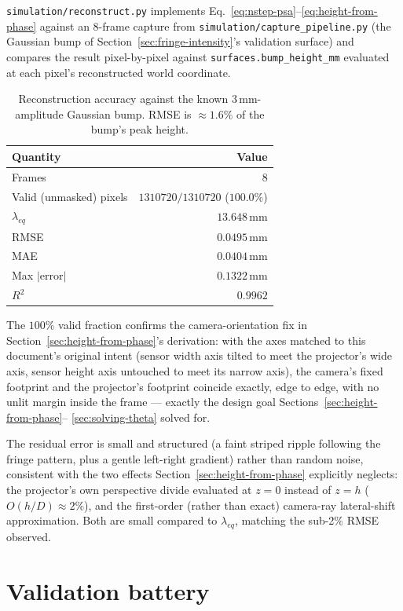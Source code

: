 \documentclass[11pt]{article}
\begin{document}
\texttt{simulation/reconstruct.py} implements
Eq.~\ref{eq:nstep-psa}--\ref{eq:height-from-phase} against an 8-frame
capture from \texttt{simulation/capture\_pipeline.py} (the Gaussian bump of
Section~\ref{sec:fringe-intensity}'s validation surface) and compares the
result pixel-by-pixel against \texttt{surfaces.bump\_height\_mm} evaluated
at each pixel's reconstructed world coordinate.

\begin{table}[h]
\centering
\begin{tabular}{@{}lr@{}}
\toprule
Quantity & Value \\
\midrule
Frames & $8$ \\
Valid (unmasked) pixels & $1310720 / 1310720$ ($100.0\%$) \\
$\lambda_{eq}$ & $13.648$\,mm \\
RMSE & $0.0495$\,mm \\
MAE & $0.0404$\,mm \\
Max $|$error$|$ & $0.1322$\,mm \\
$R^2$ & $0.9962$ \\
\bottomrule
\end{tabular}
\caption{Reconstruction accuracy against the known $3$\,mm-amplitude
Gaussian bump. RMSE is $\approx 1.6\%$ of the bump's peak height.}
\end{table}

The $100\%$ valid fraction confirms the camera-orientation fix in
Section~\ref{sec:height-from-phase}'s derivation: with the axes matched to
this document's original intent (sensor width axis tilted to meet the
projector's wide axis, sensor height axis untouched to meet its narrow
axis), the camera's fixed footprint and the projector's footprint coincide
exactly, edge to edge, with no unlit margin inside the frame --- exactly
the design goal Sections~\ref{sec:height-from-phase}--
\ref{sec:solving-theta} solved for.

The residual error is small and structured (a faint striped ripple
following the fringe pattern, plus a gentle left-right gradient) rather
than random noise, consistent with the two effects
Section~\ref{sec:height-from-phase} explicitly neglects: the projector's
own perspective divide evaluated at $z=0$ instead of $z=h$
($O(h/D)\approx2\%$), and the first-order (rather than exact) camera-ray
lateral-shift approximation. Both are small compared to $\lambda_{eq}$,
matching the sub-2\% RMSE observed.

\section{Validation battery}
\label{sec:validation-battery}
\end{document}
